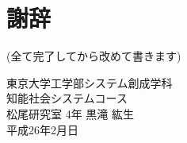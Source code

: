 \chapter*{謝辞}
(全て完了してから改めて書きます)
\\
\begin{flushright}
東京大学工学部システム創成学科 \\
知能社会システムコース\\
松尾研究室 4年 黒滝 紘生\\
平成26年2月日\\
\end{flushright}